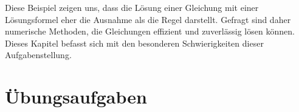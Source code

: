Diese Beispiel zeigen uns, dass die Lösung einer Gleichung mit
einer Lösungsformel eher die Ausnahme als die Regel darstellt.
Gefragt sind daher numerische Methoden, die Gleichungen effizient
und zuverlässig lösen können.
Dieses Kapitel befasst sich mit den besonderen Schwierigkeiten dieser
Aufgabenstellung.






\section*{Übungsaufgaben}
\begin{uebungsaufgaben}
\end{uebungsaufgaben}

